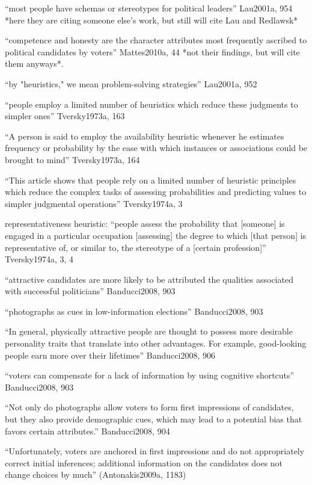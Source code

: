 ``most people have schemas or stereotypes for political leaders'' Lau2001a, 954 *here they are citing someone else's work, but still will cite Lau and Redlawsk*

``competence and honesty are the character attributes most frequently ascribed to political candidates by voters'' Mattes2010a, 44 *not their findings, but will cite them anyways*.

``by "heuristics," we mean problem-solving strategies'' Lau2001a, 952

``people employ a limited number of heuristics which reduce these judgments to simpler ones'' Tversky1973a, 163

``A person is said to employ the availability heuristic whenever he estimates frequency or probability by the ease with which instances or associations could be brought to mind'' Tversky1973a, 164

``This article shows that people rely on a limited number of heuristic principles which reduce the complex tasks of assessing probabilities and predicting values to simpler judgmental operations'' Tversky1974a, 3

representativeness heuristic: ``people assess the probability that [someone] is engaged in a particular occupation [assessing] the degree to which [that person] is representative of, or similar to, the stereotype of a [certain profession]'' Tversky1974a, 3, 4

``attractive candidates are more likely to be attributed the qualities associated with successful politicians'' Banducci2008, 903

``photographs as cues in low-information elections'' Banducci2008, 903

``In general, physically attractive people are thought to possess more desirable
personality traits that translate into other advantages. For example, good-looking people earn more over their lifetimes'' Banducci2008, 906

``voters can compensate for a lack of information by using cognitive shortcuts'' Banducci2008, 903


	``Not only do photographs allow voters to form first impressions of candidates, but they also provide demographic cues, which may lead to a potential bias that favors certain attributes.'' Banducci2008, 904

	``Unfortunately, voters are anchored in first impressions and do not appropriately correct initial inferences; additional information on the candidates does not change choices by much'' (Antonakis2009a, 1183)

